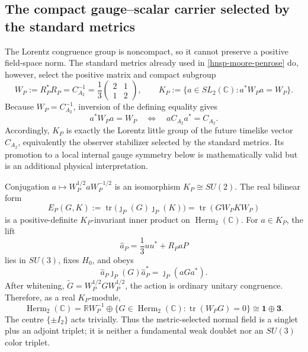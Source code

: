\subsection{The compact gauge--scalar carrier selected by the standard metrics}

The Lorentz congruence group is noncompact, so it cannot preserve a positive
field-space norm.  The standard metrics already used in
\eqref{hnsp-moore-penrose} do, however, select the positive matrix and compact
subgroup
\begin{equation}
 W_P:=R_P^*R_P=C_{A_2}^{-1}
 =\frac13\begin{pmatrix}2&1\\1&2\end{pmatrix},\qquad
 K_P:=\{a\in SL_2(\mathbb C):a^* W_P a=W_P\}.
 \label{hnsp-intrinsic-compact-group}
\end{equation}
Because \(W_P=C_{A_2}^{-1}\), inversion of the defining equality gives
\[
 a^*W_Pa=W_P
 \quad\Longleftrightarrow\quad
 aC_{A_2}a^*=C_{A_2}.
\]
Accordingly, \(K_P\) is exactly the Lorentz little group of the future
timelike vector \(C_{A_2}\), equivalently the observer stabilizer selected by
the standard metrics.  Its promotion to a local internal gauge symmetry below
is mathematically valid but is an additional physical interpretation.

\begin{proposition}
\label{hnsp-intrinsic-compact-representation}
Conjugation \(a\mapsto W_P^{1/2}aW_P^{-1/2}\) is an isomorphism
\(K_P\cong SU(2)\).  The real bilinear form
\begin{equation}
 E_P(G,K):=\operatorname{tr}\bigl(\jmath_P(G)\jmath_P(K)\bigr)
 =\operatorname{tr}(G W_P K W_P)
 \label{hnsp-positive-normal-metric}
\end{equation}
is a positive-definite \(K_P\)-invariant inner product on
\(\operatorname{Herm}_2(\mathbb C)\).  For \(a\in K_P\), the lift
\begin{equation}
 \widehat a_P=\frac13uu^*+R_P a P
 \label{hnsp-compact-lift}
\end{equation}
lies in \(SU(3)\), fixes \(H_0\), and obeys
\begin{equation}
 \widehat a_P\jmath_P(G)\widehat a_P^*=\jmath_P(aGa^*).
 \label{hnsp-compact-equivariance}
\end{equation}
After whitening, \(\widetilde G=W_P^{1/2}GW_P^{1/2}\), the action is
ordinary unitary congruence.  Therefore, as a real \(K_P\)-module,
\begin{equation}
 \operatorname{Herm}_2(\mathbb C)
 =\mathbb R W_P^{-1}
  \oplus\{G\in\operatorname{Herm}_2(\mathbb C):
              \operatorname{tr}(W_PG)=0\}
 \cong\boldsymbol 1\oplus\boldsymbol 3.
 \label{hnsp-singlet-adjoint-decomposition}
\end{equation}
The centre \(\{\pm I_2\}\) acts trivially.  Thus the metric-selected normal
field is a singlet plus an adjoint triplet; it is neither a fundamental weak
doublet nor an \(SU(3)\) color triplet.
\end{proposition}

